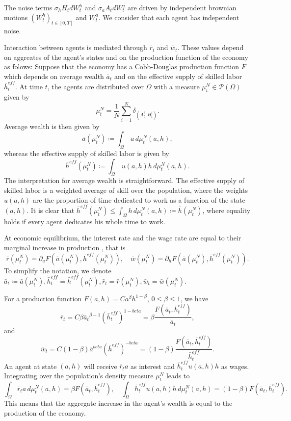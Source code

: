 The noise terms $\sigma_h H_t dW^h_t$ and $\sigma_a A_t dW^a_t$ are driven by independent brownian motions $(W^h_t)_{t \in [0,T]}$ and $W^a_t$.
We consider that each agent has independent noise.

Interaction between agents is mediated through $\bar r_t$ and $\bar w_t$.
These values depend on aggreates of the agent's states and on the production function of the economy as folows:
Suppose that the economy has a Cobb-Douglas production \cite{find a citation for cobb douglas} function $F$ which depends on average wealth $\bar a_t$ 
and on the effective supply of skilled labor $\bar h_t^{eff}$.
At time $t$, the agents are distributed over $\Omega$ with a measure $\mu^N_t \in \mathcal{P}(\Omega)$ given by
\[
\mu^N_t = \frac{1}{N} \sum_{i = 1}^N \delta_{(A^i_t, H^i_t)}.
\]
Average wealth is then given by
\[
\bar a(\mu^N_t) \coloneqq \int_\Omega \, a \, d\mu^N_t (a,h),
\]
whereas the effective supply of skilled labor is given by
\[
\bar h^{eff}(\mu^N_t) \coloneqq \int_\Omega \, u(a,h) h \, d\mu^N_t (a,h).
\]
The interpretation for average wealth is straightforward.
The effective supply of skilled labor is a weighted average of skill over the population, where the weights $u(a,h)$ are the proportion of time dedicated to work as a function of the state $(a,h)$.
It is clear that $\bar h^{eff}(\mu^N_t) \leq \int_\Omega  h \, d\mu^N_t (a,h) \coloneqq \bar h(\mu^N_t)$, where equality holds if every agent dedicates his whole time to work.

At economic equilibrium, the interest rate and the wage rate are equal to their marginal increase in production \cite{find a citation for this}, that is
\[
\bar r(\mu^N_t)= \partial_a F(\bar a(\mu^N_t), \bar h^{eff}(\mu^N_t)), \quad \bar w(\mu^N_t)= \partial_h F(\bar a(\mu^N_t), \bar h^{eff}(\mu^N_t)).
\]
To simplify the notation, we denote
$\bar a_t \coloneqq \bar a(\mu^N_t), \bar h^{eff}_t = \bar h^{eff}(\mu^N_t), \bar r_t = \bar r(\mu^N_t), \bar w_t = \bar w(\mu^N_t)$.


For a production function $F(a,h) = C a^\beta h^{1 - \beta}$, $0 \leq \beta \leq 1$, we have
\[
\bar r_t = C \beta {\bar a_t}^{\beta - 1} ({\bar h}^{eff}_t)^{1 - beta} = \beta \frac{F(\bar a_t, \bar h^{eff}_t)}{\bar a_t},
\]
and
\[
\bar w_t = C (1 - \beta) {\bar a}^{beta} ({\bar h^{eff}})^{ - beta} = (1 - \beta) \frac{F (\bar a_t, \bar h^{eff}_t)}{\bar h^{eff}_t}.
\]
An agent at state $(a,h)$ will receive $\bar r_t a$ as interest and $\bar h^{eff}_t u(a,h) h$ as wages.
Integrating over the population's density measure $\mu^N_t$ leads to
\[
    \int_\Omega \bar r_t a \, d\mu^N_t(a,h) = \beta F(\bar a_t, \bar h^{eff}_t),\quad \int_\Omega \bar h^{eff}_t u(a,h) h \, d\mu^N_t(a,h) = (1 - \beta) F(\bar a_t, \bar h^{eff}_t).    
\]
This means that the aggregate increase in the agent's wealth is equal to the production of the economy.

